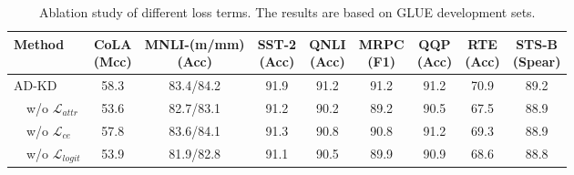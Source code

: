 \documentclass[11pt]{article}
\begin{document}
\begin{table}[t]
        
        \begin{adjustbox}{width=0.82\width,center}
	\begin{tabular}{l|cccccccc} 
		\toprule
		Method & \makecell[c]{CoLA\\(Mcc)} &\makecell[c]{MNLI-(m/mm)\\(Acc)} &\makecell[c]{SST-2\\(Acc)} &\makecell[c]{QNLI\\(Acc)} &\makecell[c]{MRPC\\(F1)} &\makecell[c]{QQP\\(Acc)} &\makecell[c]{RTE\\(Acc)} &\makecell[c]{STS-B\\(Spear)}\\ 
		\hline
            AD-KD &58.3 &83.4/84.2 &91.9 &91.2 &91.2 &91.2 &70.9 &89.2  \\
            \ \ w/o $\mathcal{L}_{attr}$ &53.6 &82.7/83.1 &91.2 &90.2 &89.2 &90.5 &67.5 &88.9  \\
            \ \ w/o $\mathcal{L}_{ce}$ &57.8 &83.6/84.1 &91.3 &90.8 &90.8 &91.2 &69.3 &88.9 \\
            \ \ w/o $\mathcal{L}_{logit}$ &53.9 &81.9/82.8 &91.1 &90.5 &89.9 &90.9 &68.6 &88.8 \\
            \bottomrule
	\end{tabular}
        \end{adjustbox}
        \caption{Ablation study of different loss terms. The results are based on GLUE development sets.}
	\label{tab:ablation of AM}
 \vspace{-4mm}
\end{table}

\end{document}
